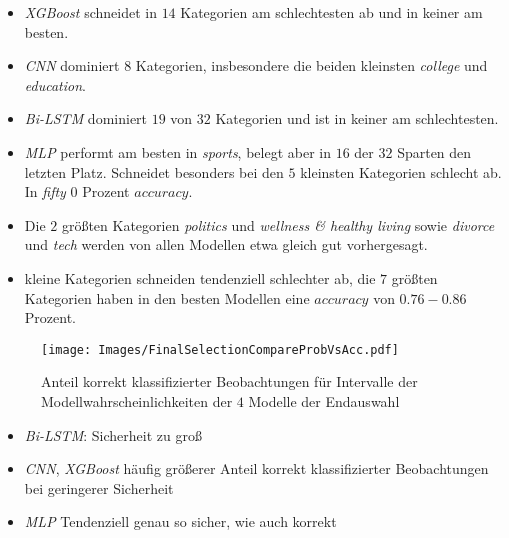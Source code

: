 \documentclass[8pt, xcolor = dvipsnames]{beamer}
\begin{document}
\begin{frame}
\begin{itemize}
    \item \textit{XGBoost} schneidet in $14$ Kategorien am schlechtesten ab und in keiner am besten.
     \item \textit{CNN} dominiert $8$ Kategorien, insbesondere die beiden kleinsten \textit{college} und \textit{education}.
    \item \textit{Bi-LSTM} dominiert $19$ von $32$ Kategorien und ist in keiner am schlechtesten.
    \item \textit{MLP} performt am besten in \textit{sports}, belegt aber in $16$ der $32$ Sparten den letzten Platz. Schneidet besonders bei den $5$ kleinsten Kategorien schlecht ab. In  \textit{fifty} $0$ Prozent $accuracy$.
    \item Die $2$ größten Kategorien \textit{politics} und \textit{wellness \& healthy living} sowie \textit{divorce} und \textit{tech} werden von  allen Modellen etwa gleich gut vorhergesagt.
    \item kleine Kategorien schneiden tendenziell schlechter ab, die $7$ größten Kategorien haben in den besten Modellen eine $accuracy$ von $0.76- 0.86$ Prozent.
\end{itemize}{}
\end{frame}{}







\begin{frame}
\begin{figure}[ht]
    \centering
\texttt{[image: Images/FinalSelectionCompareProbVsAcc.pdf]} 
\caption{Anteil korrekt klassifizierter Beobachtungen für Intervalle der Modellwahrscheinlichkeiten der $4$ Modelle der Endauswahl}
\label{abb:CompareProbVsAcc}
\end{figure}
\end{frame}


\begin{frame}
\begin{itemize}
    \item \textit{Bi-LSTM}: Sicherheit zu groß
    \item \textit{CNN}, \textit{XGBoost} häufig größerer Anteil korrekt klassifizierter Beobachtungen bei geringerer Sicherheit
    \item \textit{MLP} Tendenziell genau so sicher, wie auch korrekt
\end{itemize}{}
\end{frame}{}
\end{document}
